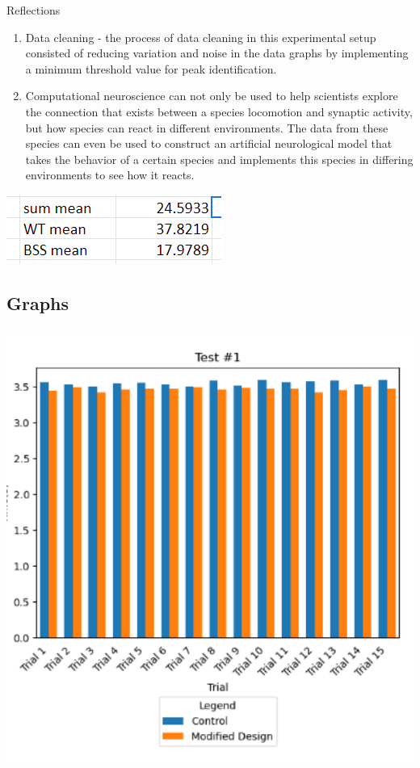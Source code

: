Reflections

\begin{enumerate}
\def\labelenumi{\arabic{enumi}.}
\item
  Data cleaning - the process of data cleaning in this experimental
  setup consisted of reducing variation and noise in the data graphs by
  implementing a minimum threshold value for peak identification.
\item
  Computational neuroscience can not only be used to help scientists
  explore the connection that exists between a species\textquotesingle{}
  locomotion and synaptic activity, but how species can react in
  different environments. The data from these species can even be used
  to construct an artificial neurological model that takes the behavior
  of a certain species and implements this species in differing
  environments to see how it reacts.
\end{enumerate}

\includegraphics[width=2.77083in,height=0.89583in]{media/image25.png}

\subsection{Graphs}\label{graphs}

\includegraphics[width=5.40982in,height=5.66208in]{media/image2.png}

